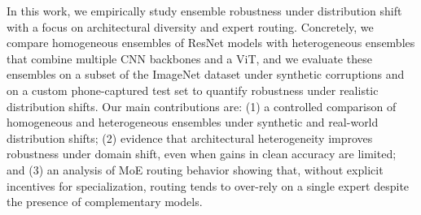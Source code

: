 In this work, we empirically study ensemble robustness under distribution shift with a focus on architectural diversity and expert routing.
Concretely, we compare homogeneous ensembles of ResNet models with heterogeneous ensembles that combine multiple CNN backbones and a ViT, and we evaluate these ensembles on a subset of the ImageNet dataset under synthetic corruptions and on a custom phone-captured test set to quantify robustness under realistic distribution shifts.
Our main contributions are: (1) a controlled comparison of homogeneous and heterogeneous ensembles under synthetic and real-world distribution shifts; (2) evidence that architectural heterogeneity improves robustness under domain shift, even when gains in clean accuracy are limited; and (3) an analysis of MoE routing behavior showing that, without explicit incentives for specialization, routing tends to over-rely on a single expert despite the presence of complementary models.